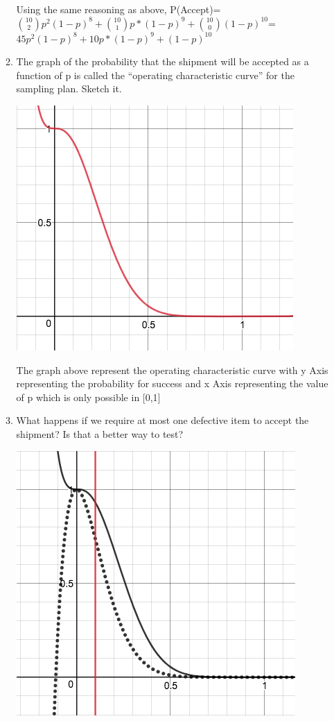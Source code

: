 \documentclass[11pt, oneside]{article}
\begin{document}
\begin{enumerate}
\begin{enumerate}
        Using the same reasoning as above, P(Accept)=${10\choose 2}p^2(1-p)^8+{10 \choose 1}p*(1-p)^9+{10\choose 0}(1-p)^{10}$= $45p^2(1-p)^8+10p*(1-p)^9+ (1-p)^{10}$
        \item The graph of the probability that the shipment will be accepted as
        a function of p is called the “operating characteristic curve” for the
        sampling plan. Sketch it.
        \begin{center}
        \includegraphics[scale=0.3]{901}
        \end{center}
        The graph above represent the operating characteristic curve with y Axis representing the probability for success and x Axis representing the value of p which is only possible in [0,1]
        \item What happens if we require at most one defective item to accept the
        shipment? Is that a better way to test?
        \begin{center}
        \includegraphics[scale=0.3]{903}

\end{center}
\end{enumerate}
\end{enumerate}
\end{document}
